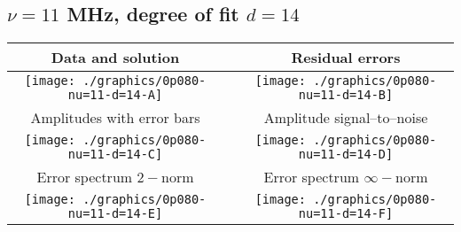 

% 

\clearpage{}
\break{}

\subsection{$\nu = 11$ MHz, degree of fit $d = 14$}

\begin{table}[h]
    \begin{center}
        \begin{tabular}{ccc}
            Data and solution & \quad & Residual errors \\\hline
            \texttt{[image: ./graphics/0p080-nu=11-d=14-A]} &&
            \texttt{[image: ./graphics/0p080-nu=11-d=14-B]} \\[15pt]
            Amplitudes with error bars && Amplitude signal--to--noise \\\hline
            \texttt{[image: ./graphics/0p080-nu=11-d=14-C]} &&
            \texttt{[image: ./graphics/0p080-nu=11-d=14-D]} \\[15pt]
            Error spectrum $2-$norm && Error spectrum $\infty-$norm \\\hline
            \texttt{[image: ./graphics/0p080-nu=11-d=14-E]} &&
            \texttt{[image: ./graphics/0p080-nu=11-d=14-F]} \\[15pt]
        \end{tabular}
    \end{center}
\label{fig:elev=80, nu=11}
\end{table}



\endinput
